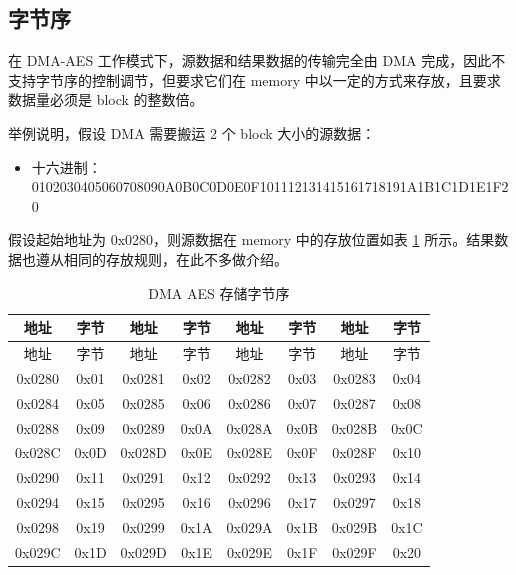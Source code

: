 \documentclass[main\_\_CN.tex]{subfiles}
\begin{document}
    
\subsection{字节序}

在 DMA-AES 工作模式下，源数据和结果数据的传输完全由 DMA 完成，因此不支持字节序的控制调节，但要求它们在 memory 中以一定的方式来存放，且要求数据量必须是 block 的整数倍。

举例说明，假设 DMA 需要搬运 2 个 block 大小的源数据：

\begin{itemize}
    \item 十六进制： 0102030405060708090A0B0C0D0E0F101112131415161718191A1B1C1D1E1F20
\end{itemize}

假设起始地址为 0x0280，则源数据在 memory 中的存放位置如表 \ref{tab:aes-dma-aes-plaintext-ciphertext-endian} 所示。结果数据也遵从相同的存放规则，在此不多做介绍。

\begin{longtable}[c]
{ |c|c|c|c|c|c|c|c|}
\caption{DMA AES 存储字节序} 
\label{tab:aes-dma-aes-plaintext-ciphertext-endian}\\
\hline 
\rowcolor{lightgray}
地址 &  字节  & 地址 &  字节  & 地址 &  字节  & 地址 &  字节 \\\hline
\endfirsthead
\hline
\rowcolor{lightgray}
地址 &  字节  & 地址 &  字节  & 地址 &  字节  & 地址 &  字节 \\\hline
\endhead
\endfoot
0x0280 & 0x01 & 0x0281 & 0x02 & 0x0282 & 0x03 & 0x0283 & 0x04 \\\hline 
0x0284 & 0x05 & 0x0285 & 0x06 & 0x0286 & 0x07 & 0x0287 & 0x08 \\\hline 
0x0288 & 0x09 & 0x0289 & 0x0A & 0x028A & 0x0B & 0x028B & 0x0C \\\hline 
0x028C & 0x0D & 0x028D & 0x0E & 0x028E & 0x0F & 0x028F & 0x10 \\\hline 
0x0290 & 0x11 & 0x0291 & 0x12 & 0x0292 & 0x13 & 0x0293 & 0x14 \\\hline 
0x0294 & 0x15 & 0x0295 & 0x16 & 0x0296 & 0x17 & 0x0297 & 0x18 \\\hline 
0x0298 & 0x19 & 0x0299 & 0x1A & 0x029A & 0x1B & 0x029B & 0x1C \\\hline 
0x029C & 0x1D & 0x029D & 0x1E & 0x029E & 0x1F & 0x029F & 0x20 \\\hline  
\end{longtable}

\end{document}
